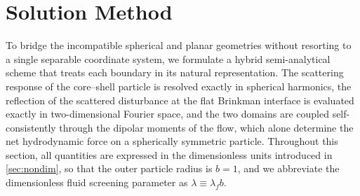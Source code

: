 \section{Solution Method}\label{sec:analysis}

To bridge the incompatible spherical and planar geometries without resorting to a single separable coordinate system, we
formulate a hybrid semi-analytical scheme that treats each boundary in its natural representation. The scattering
response of the core--shell particle is resolved exactly in spherical harmonics, the reflection of the scattered
disturbance at the flat Brinkman interface is evaluated exactly in two-dimensional Fourier space, and the two domains are
coupled self-consistently through the dipolar moments of the flow, which alone determine the net hydrodynamic force on a
spherically symmetric particle. Throughout this section, all quantities are expressed in the dimensionless units
introduced in \cref{sec:nondim}, so that the outer particle radius is $b=1$, and we abbreviate the dimensionless fluid
screening parameter as $\lambda\equiv\lambda_fb$.

